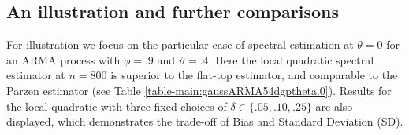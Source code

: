 \documentclass[12p E.Lt,psfig]{article} %
\begin{document}
   \subsection{An illustration and further comparisons}
       For illustration we focus on the particular case of  spectral estimation at $\theta = 0$ for
  an  ARMA process with $\phi = .9$ and $\vartheta = .4$.
  Here the  local quadratic spectral estimator at $n= 800$ is superior to the flat-top estimator,
  and comparable to the Parzen estimator  (see Table \ref{table-main:gaussARMA54dgptheta.0}).
  Results for the local quadratic with three fixed choices of $\delta \in \{ .05, .10, .25 \}$ are also
  displayed, which demonstrates the trade-off of Bias and Standard Deviation (SD).


\end{document}
